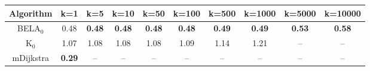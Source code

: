 \begin{tabular}{c|ccccccccc}\toprule
Algorithm & k=1 & k=5 & k=10 & k=50 & k=100 & k=500 & k=1000 & k=5000 & k=10000 \\ \midrule
BELA$_0$ & 0.48 & \textbf{0.48} & \textbf{0.48} & \textbf{0.48} & \textbf{0.48} & \textbf{0.49} & \textbf{0.49} & \textbf{0.53} & \textbf{0.58} \\
K$_0$ & 1.07 & 1.08 & 1.08 & 1.08 & 1.09 & 1.14 & 1.21 & -- & -- \\
mDijkstra & \textbf{0.29} & -- & -- & -- & -- & -- & -- & -- & -- \\ \bottomrule 
\end{tabular}
